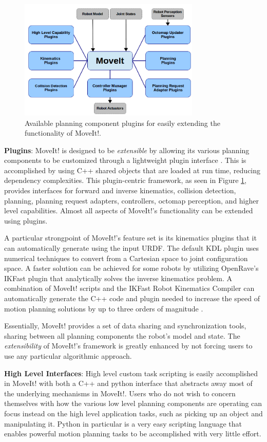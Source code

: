 \documentclass[10pt,journal,compsoc]{joser1}
\begin{document}
{\begin{figure}[!t]
\centering
\includegraphics[width=3.4in]{coleman_20131110_f10}
\caption{Available planning component plugins for easily extending the functionality of MoveIt!.}
\label{fig:moveit_plugins}
\end{figure}

{\bf Plugins}: MoveIt! is designed to be \textit{extensible} by allowing its various planning components to be customized through a lightweight plugin interface \cite{moveit}. This is accomplished by using C++ shared objects that are loaded at run time, reducing dependency complexities. This plugin-centric framework, as seen in Figure \ref{fig:moveit_plugins}, provides interfaces for forward and inverse kinematics, collision detection, planning, planning request adapters, controllers, octomap perception, and higher level capabilities. Almost all aspects of MoveIt!'s functionality can be extended using plugins.

A particular strongpoint of MoveIt!'s feature set is its kinematics plugins that it can automatically generate using the input URDF. The default KDL plugin uses numerical techniques to convert from a Cartesian space to joint configuration space. A faster solution can be achieved for some robots by utilizing OpenRave's IKFast \cite{ikfast} plugin that analytically solves the inverse kinematics problem. A combination of MoveIt! scripts and the IKFast Robot Kinematics Compiler can automatically generate the C++ code and plugin needed to increase the speed of motion planning solutions by up to three orders of magnitude \cite{ikfast}.

Essentially, MoveIt! provides a set of data sharing and synchronization tools, sharing between all planning components the robot's model and state. The \textit{extensibility} of MoveIt!'s framework is greatly enhanced by not forcing users to use any particular algorithmic approach. 

{\bf High Level Interfaces}: High level custom task scripting is easily accomplished in MoveIt! with both a C++ and python interface that abstracts away most of the underlying mechanisms in MoveIt!. Users who do not wish to concern themselves with how the various low level planning components are operating can focus instead on the high level application tasks, such as picking up an object and manipulating it. Python in particular is a very easy scripting language that enables powerful motion planning tasks to be accomplished with very little effort.

}
\end{document}
